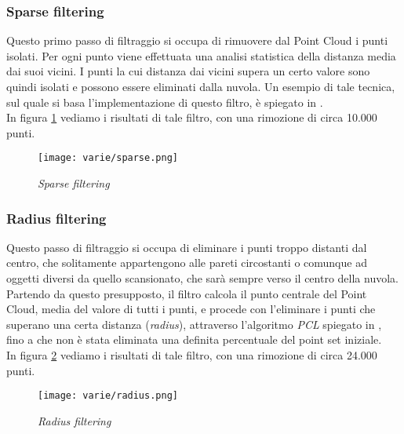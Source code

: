 \subsubsection{Sparse filtering}
Questo primo passo di filtraggio si occupa di rimuovere dal Point Cloud i punti isolati. Per ogni punto viene effettuata una analisi statistica della distanza media dai suoi vicini. I punti la cui distanza dai vicini supera un certo valore sono quindi isolati e possono essere eliminati dalla nuvola.
Un esempio di tale tecnica, sul quale si basa l'implementazione di questo filtro, è spiegato in \cite{site:outliers}.\\
In figura \ref{fig:sparse} vediamo i risultati di tale filtro, con una rimozione di circa 10.000 punti.
\begin{figure}[!h] 
    \centering 
    \texttt{[image: varie/sparse.png]} 
    \caption{\emph{Sparse filtering}}
    \label{fig:sparse}
\end{figure}
\subsubsection{Radius filtering}
Questo passo di filtraggio si occupa di eliminare i punti troppo distanti dal centro, che solitamente appartengono alle pareti circostanti o comunque ad oggetti diversi da quello scansionato, che sarà sempre verso il centro della nuvola.\\
Partendo da questo presupposto, il filtro calcola il punto centrale del Point Cloud, media del valore di tutti i punti, e procede con l'eliminare i punti che superano una certa distanza (\emph{radius}), attraverso l'algoritmo \emph{PCL} spiegato in \cite{site:passthrough}, fino a che non è stata eliminata una definita percentuale del point set iniziale.\\
In figura \ref{fig:radius} vediamo i risultati di tale filtro, con una rimozione di circa 24.000 punti.
\begin{figure}[!h] 
    \centering 
    \texttt{[image: varie/radius.png]} 
    \caption{\emph{Radius filtering}}
    \label{fig:radius}
\end{figure}
